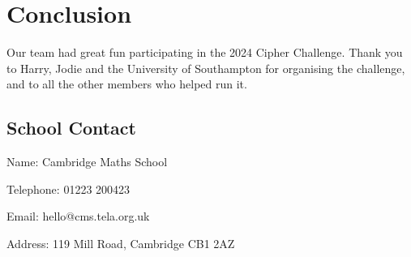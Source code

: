\section*{Conclusion}

Our team had great fun participating in the 2024 Cipher Challenge. Thank you to Harry, Jodie and the University of Southampton for organising the challenge, and to all the other members who helped run it.

\subsection*{School Contact}

Name: Cambridge Maths School \par
Telephone: 01223 200423 \par
Email: hello@cms.tela.org.uk \par
Address: 119 Mill Road, Cambridge CB1 2AZ